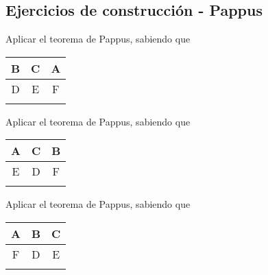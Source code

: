 \subsection{Ejercicios de construcción - Pappus}


\begin{section-exercise}
    Aplicar el teorema de Pappus, sabiendo que
    \begin{tabular}{|c|c|c|}
        \hline
        B & C & A\\\hline
        D & E & F\\
        \hline \hline
        &&\\
        \hline
    \end{tabular}
    \vspace{-0.4cm}
    \begin{figure}[H]
        \centering
        
    \end{figure}
\end{section-exercise}
\vspace{-4cm}
\begin{section-exercise}
    Aplicar el teorema de Pappus, sabiendo que
    \begin{tabular}{|c|c|c|}
        \hline
        A & C & B\\\hline
        E & D & F\\
        \hline \hline
        &&\\
        \hline
    \end{tabular}
    \vspace{-0.4cm}
    \begin{figure}[H]
        \centering
        
    \end{figure}
\end{section-exercise}

\begin{section-exercise}
    Aplicar el teorema de Pappus, sabiendo que
    \begin{tabular}{|c|c|c|}
        \hline
        A & B & C\\\hline
        F & D & E\\
        \hline \hline
        &&\\
        \hline
    \end{tabular}
    \vspace{-2cm}
    \begin{figure}[H]
        \centering
        
    \end{figure}
    \vspace{-2cm}
\end{section-exercise}


